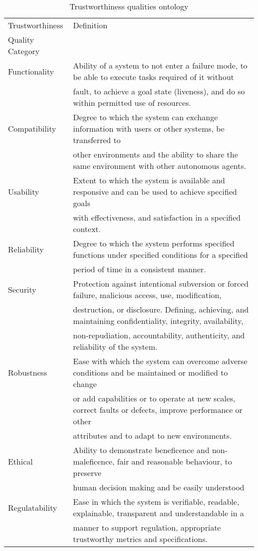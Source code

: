 \begin{table*}[t]
\caption{Trustworthiness qualities ontology}\label{tab:quals}
\centering
\begin{tabular}{ll}
\toprule
Trustworthiness  & Definition                \\ 
Quality Category   &   \\ \midrule

Functionality & Ability of a system to not enter a failure mode, to be able to execute tasks required of it without \\
&fault, to achieve a goal state (liveness), and do so within permitted use of resources.\\

Compatibility & Degree to which the system can exchange information with users or other systems, be transferred to\\
&other environments and the ability to share the same environment with other autonomous agents.\\

Usability & Extent to which the system is available and responsive and can be used to achieve specified goals\\
&with effectiveness, and satisfaction in a specified context.\\

Reliability & Degree to which the system performs specified functions under specified conditions for a specified\\
&period of time in a consistent manner.\\

Security & Protection against intentional subversion or forced failure, malicious access, use, modification, \\
&destruction, or disclosure. Defining, achieving, and maintaining confidentiality, integrity, availability, \\
&non‐repudiation, accountability, authenticity, and reliability of the system. \\

Robustness & Ease with which the system can overcome adverse conditions and be maintained or modified to change\\
&or add capabilities or to operate at new scales, correct faults or defects, improve performance or other\\
&attributes and to adapt to new environments.\\

Ethical & Ability to demonstrate beneficence and non-maleficence, fair and reasonable behaviour, to preserve\\
&human decision making and be easily understood\\

Regulatability & Ease in which the system is verifiable, readable, explainable, transparent and understandable in a \\
&manner to support regulation, appropriate trustworthy metrics and specifications.\\

\bottomrule
\end{tabular}

\label{tab:ontology}
\end{table*}


